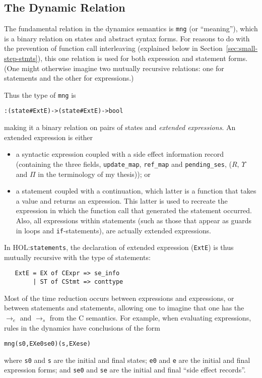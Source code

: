 \documentclass[11pt]{article}
\newcommand{\HOLfile}[1]{HOL:\texttt{#1}}
\begin{document}
\subsection{The Dynamic Relation}

\newcommand{\mng}{\texttt{mng}}

The fundamental relation in the dynamics semantics is \mng{} (or
``meaning''), which is a binary relation on states and abstract syntax
forms.  For reasons to do with the prevention of function call
interleaving (explained below in Section~\ref{sec:small-step-stmts}),
this one relation is used for both expression and statement forms.
(One might otherwise imagine two mutually recursive relations: one for
statements and the other for expressions.)

Thus the type of \mng{} is 
\begin{alltt}
   : (state # ExtE) -> (state # ExtE) -> bool
\end{alltt}
making it a binary relation on pairs of states and \emph{extended
  expressions}.  An extended expression is either
\begin{itemize}
\item a syntactic expression coupled with a side effect information
  record (containing the three fields, \texttt{update\_map},
  \texttt{ref\_map} and \texttt{pending\_ses}, ($R$, $\Upsilon$ and
  $\Pi$ in the terminology of my thesis)); or
\item a statement coupled with a continuation, which latter is a
  function that takes a value and returns an expression.  This latter
  is used to recreate the expression in which the function call
  that generated the statement occurred.  Also, all expressions within
  statements (such as those that appear as guards in loops and
  \texttt{if}-statements), are actually extended expressions.
\end{itemize}

In \HOLfile{statements}, the declaration of extended expression
(\texttt{ExtE}) is thus mutually recursive with the type of
statements:
\begin{verbatim}
   ExtE = EX of CExpr => se_info
        | ST of CStmt => conttype
\end{verbatim}

Most of the time reduction occurs between expressions and expressions,
or between statements and statements, allowing one to imagine that one
has the $\rightarrow_e$ and $\rightarrow_s$ from the C semantics. 
For example, when evaluating expressions, rules in the dynamics have
conclusions of the form
\begin{alltt}
   mng (s0, EX e0 se0) (s, EX e se)
\end{alltt}
where \texttt{s0} and \texttt{s} are the initial and final states;
\texttt{e0} and \texttt{e} are the initial and final expression forms;
and \texttt{se0} and \texttt{se} are the initial and final ``side
effect records''.
\end{document}
